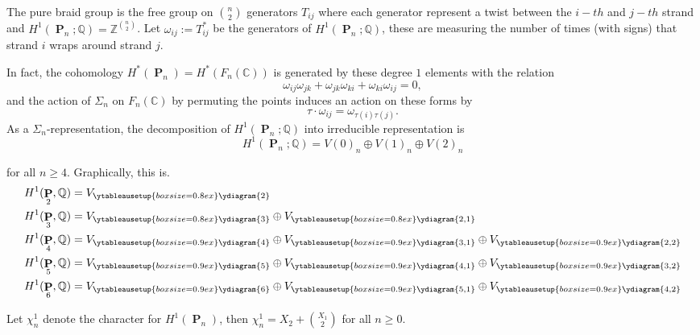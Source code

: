 \documentclass[11pt, letterpaper, notitlepage, oneside]{amsart}
\DeclareMathOperator{\PB}{\mathbf{P}}
\newcommand{\bbZ}{\mathbb{Z}}
\newcommand{\bbQ}{\mathbb{Q}}
\newcommand{\bbC}{\mathbb{C}}
\theoremstyle{definition}
\theoremstyle{plain}
\begin{document}
\noindent The  pure braid group is the free group on $n\choose 2$ generators $T_{ij}$ where each generator represent a twist between the $i-th$ and $j-th$ strand and  $H^1(\PB_n; \bbQ)=\bbZ^{n\choose 2}$. Let $\omega_{ij}:= T_{ij}^*$ be the generators of $H^1(\PB_n; \bbQ)$, these are measuring the number of times (with signs) that strand $i$ wraps around strand  $j$. 

\noindent In fact, the cohomology $H^*(\PB_n)= H^*(F_n(\bbC))$ is generated by these degree $1$ elements with  the relation $$\omega_{ij}\omega_{jk}+\omega_{jk}\omega_{ki}+\omega_{ki}\omega_{ij}=0,$$ and the action of $\Sigma_n$ on $F_n(\bbC)$ by permuting the points induces an action on these forms by  $$\tau\cdot \omega_{ij}= \omega_{\tau(i)\tau(j)}.$$
\noindent As a $\Sigma_n$-representation, the decomposition of $H^1(\PB_n; \bbQ)$ into irreducible representation is
     \[H^1(\PB_n; \bbQ)= V(0)_n \oplus V(1)_n \oplus V(2)_n \]


     \noindent for all $n\geq 4$. Graphically, this is.
     \begin{align*}
     H^1(\PB_2,\bbQ) &= V_{\ytableausetup{boxsize=0.8ex}\ydiagram{2}} \\
     H^1(\PB_3, \bbQ) &= V_{\ytableausetup{boxsize=0.8ex}\ydiagram{3}}\oplus V_{\ytableausetup{boxsize=0.8ex}\ydiagram{2,1}} \\
     H^1(\PB_4, \bbQ) &=V_{\ytableausetup{boxsize=0.9ex}\ydiagram{4}}\oplus V_{\ytableausetup{boxsize=0.9ex}\ydiagram{3,1}}\oplus V_{\ytableausetup{boxsize=0.9ex}\ydiagram{2,2}}\\
     H^1(\PB_5, \bbQ) &=V_{\ytableausetup{boxsize=0.9ex}\ydiagram{5}}\oplus V_{\ytableausetup{boxsize=0.9ex}\ydiagram{4,1}}\oplus V_{\ytableausetup{boxsize=0.9ex}\ydiagram{3,2}}  \\
     H^1(\PB_6, \bbQ) &=V_{\ytableausetup{boxsize=0.9ex}\ydiagram{6}}\oplus V_{\ytableausetup{boxsize=0.9ex}\ydiagram{5,1}}\oplus V_{\ytableausetup{boxsize=0.9ex}\ydiagram{4,2}}
\end{align*}
     

Let $\chi_n^1$ denote the character for $H^1(\PB_n)$, then $\chi_n^1= X_2+ {X_1\choose 2}$ for all 
$n\geq 0$. 
\vspace{10pt}


\vspace{10pt}

\printbibliography
\nocite{*}



 
\end{document}
